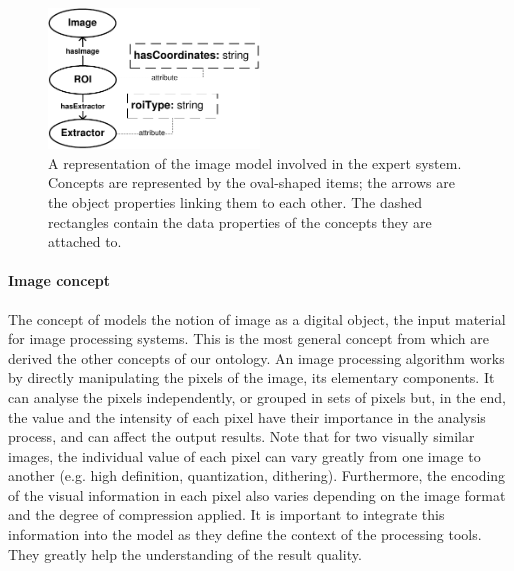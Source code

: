  \begin{figure}[!ht]
   \centering
  \includegraphics[width=0.5\textwidth]{model_image.pdf}
  \caption[A representation of the image model involved in the expert system]{A representation of the image model involved in the expert system. Concepts are represented by the oval-shaped items; the arrows are the object properties linking them to each other. The dashed rectangles contain the data properties of the concepts they are attached to.}
  \label{fig:kn:model_image}
 \end{figure}


\paragraph{Image concept} %
\label{par:image_concept}

The concept of  models the notion of image as a digital object, the input material for image processing systems.
This is the most general concept from which are derived the other concepts of our ontology.
An image processing algorithm works by directly manipulating the pixels of the image, its elementary components.
It can analyse the pixels independently, or grouped in sets of pixels but, in the end, the value and the intensity of each pixel have their importance in the analysis process, and can affect the output results.
Note that for two visually similar images, the individual value of each pixel can vary greatly from one image to another (e.g. high definition, quantization, dithering).
Furthermore, the encoding of the visual information in each pixel also varies depending on the image format and the degree of compression applied.
It is important to integrate this information into the model as they define the context of the processing tools.
They greatly help the understanding of the result quality.

